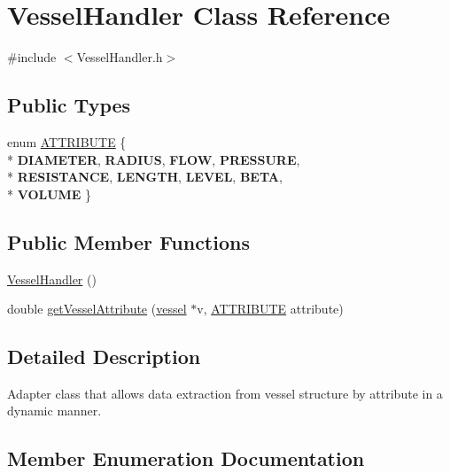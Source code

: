 \hypertarget{class_vessel_handler}{}\section{Vessel\+Handler Class Reference}
\label{class_vessel_handler}


{\ttfamily \#include $<$Vessel\+Handler.\+h$>$}

\subsection*{Public Types}
\begin{DoxyCompactItemize}
\item 
enum \hyperlink{class_vessel_handler_a6cc775e9a5bcbe69ef381f56b52982e7}{A\+T\+T\+R\+I\+B\+U\+TE} \{ \\*
{\bfseries D\+I\+A\+M\+E\+T\+ER}, 
{\bfseries R\+A\+D\+I\+US}, 
{\bfseries F\+L\+OW}, 
{\bfseries P\+R\+E\+S\+S\+U\+RE}, 
\\*
{\bfseries R\+E\+S\+I\+S\+T\+A\+N\+CE}, 
{\bfseries L\+E\+N\+G\+TH}, 
{\bfseries L\+E\+V\+EL}, 
{\bfseries B\+E\+TA}, 
\\*
{\bfseries V\+O\+L\+U\+ME}
 \}
\end{DoxyCompactItemize}
\subsection*{Public Member Functions}
\begin{DoxyCompactItemize}
\item 
\hyperlink{class_vessel_handler_afb4f79fe57971a6c27f70343bffe6104}{Vessel\+Handler} ()
\item 
double \hyperlink{class_vessel_handler_ab372d746a0206ef2660970d0666b7633}{get\+Vessel\+Attribute} (\hyperlink{structvessel}{vessel} $\ast$v, \hyperlink{class_vessel_handler_a6cc775e9a5bcbe69ef381f56b52982e7}{A\+T\+T\+R\+I\+B\+U\+TE} attribute)
\end{DoxyCompactItemize}


\subsection{Detailed Description}
Adapter class that allows data extraction from vessel structure by attribute in a dynamic manner. 

\subsection{Member Enumeration Documentation}
